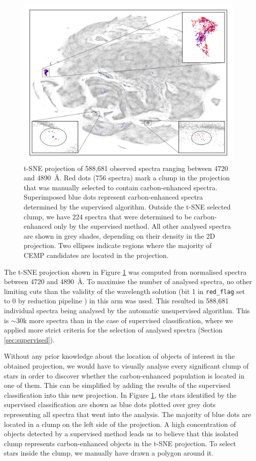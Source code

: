 \begin{figure}
	\centering
	\includegraphics[width=\textwidth]{tsne_circles.png}
	\caption{t-SNE projection of 588,681 observed spectra ranging between 4720 and 4890~\AA. Red dots (756 spectra) mark a clump in the projection that was manually selected to contain carbon-enhanced spectra. Superimposed blue dots represent carbon-enhanced spectra determined by the supervised algorithm. Outside the t-SNE selected clump, we have 224 spectra that were determined to be carbon-enhanced only by the supervised method. All other analysed spectra are shown in grey shades, depending on their density in the 2D projection. Two ellipses indicate regions where the majority of CEMP candidates are located in the projection.}
	\label{fig:tsne_plot}
\end{figure}

The t-SNE projection shown in Figure \ref{fig:tsne_plot} was computed from normalised spectra between 4720 and 4890~\AA. To maximise the number of analysed spectra, no other limiting cuts than the validity of the wavelength solution (bit 1 in \texttt{red\_flag} set to 0 by reduction pipeline \cite{2017MNRAS.464.1259K}) in this arm was used. This resulted in 588,681 individual spectra being analysed by the automatic unsupervised algorithm. This is $\sim30$k more spectra than in the case of supervised classification, where we applied more strict criteria for the selection of analysed spectra (Section \ref{sec:supervised}). 

Without any prior knowledge about the location of objects of interest in the obtained projection, we would have to visually analyse every significant clump of stars in order to discover whether the carbon-enhanced population is located in one of them. This can be simplified by adding the results of the supervised classification into this new projection. In Figure \ref{fig:tsne_plot}, the stars identified by the supervised classification are shown as blue dots plotted over grey dots representing all spectra that went into the analysis. The majority of blue dots are located in a clump on the left side of the projection. A high concentration of objects detected by a supervised method leads us to believe that this isolated clump represents carbon-enhanced objects in the t-SNE projection. To select stars inside the clump, we manually have drawn a polygon around it.

